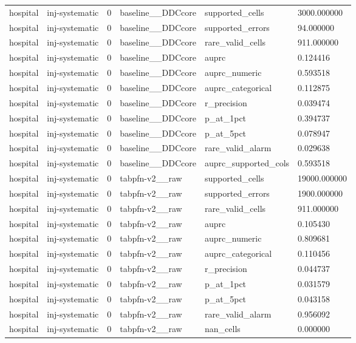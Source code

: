 \begin{tabular}{llllll}
hospital & inj-systematic & 0 & baseline\_\_DDCcore & supported\_cells & 3000.000000 \\
hospital & inj-systematic & 0 & baseline\_\_DDCcore & supported\_errors & 94.000000 \\
hospital & inj-systematic & 0 & baseline\_\_DDCcore & rare\_valid\_cells & 911.000000 \\
hospital & inj-systematic & 0 & baseline\_\_DDCcore & auprc & 0.124416 \\
hospital & inj-systematic & 0 & baseline\_\_DDCcore & auprc\_numeric & 0.593518 \\
hospital & inj-systematic & 0 & baseline\_\_DDCcore & auprc\_categorical & 0.112875 \\
hospital & inj-systematic & 0 & baseline\_\_DDCcore & r\_precision & 0.039474 \\
hospital & inj-systematic & 0 & baseline\_\_DDCcore & p\_at\_1pct & 0.394737 \\
hospital & inj-systematic & 0 & baseline\_\_DDCcore & p\_at\_5pct & 0.078947 \\
hospital & inj-systematic & 0 & baseline\_\_DDCcore & rare\_valid\_alarm & 0.029638 \\
hospital & inj-systematic & 0 & baseline\_\_DDCcore & auprc\_supported\_cols & 0.593518 \\
hospital & inj-systematic & 0 & tabpfn-v2\_\_raw & supported\_cells & 19000.000000 \\
hospital & inj-systematic & 0 & tabpfn-v2\_\_raw & supported\_errors & 1900.000000 \\
hospital & inj-systematic & 0 & tabpfn-v2\_\_raw & rare\_valid\_cells & 911.000000 \\
hospital & inj-systematic & 0 & tabpfn-v2\_\_raw & auprc & 0.105430 \\
hospital & inj-systematic & 0 & tabpfn-v2\_\_raw & auprc\_numeric & 0.809681 \\
hospital & inj-systematic & 0 & tabpfn-v2\_\_raw & auprc\_categorical & 0.110456 \\
hospital & inj-systematic & 0 & tabpfn-v2\_\_raw & r\_precision & 0.044737 \\
hospital & inj-systematic & 0 & tabpfn-v2\_\_raw & p\_at\_1pct & 0.031579 \\
hospital & inj-systematic & 0 & tabpfn-v2\_\_raw & p\_at\_5pct & 0.043158 \\
hospital & inj-systematic & 0 & tabpfn-v2\_\_raw & rare\_valid\_alarm & 0.956092 \\
hospital & inj-systematic & 0 & tabpfn-v2\_\_raw & nan\_cells & 0.000000 \\

\end{tabular}
